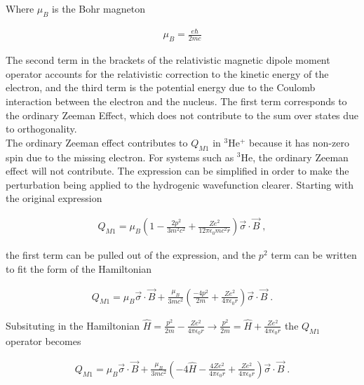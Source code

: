             \noindent Where $\mu_B$ is the Bohr magneton
            
            \begin{align}
                \mu_B = \frac{e \hbar}{2mc}
            \end{align}

            \noindent The second term in the brackets of the relativistic magnetic dipole moment operator accounts for the relativistic correction to the kinetic energy of the electron, and the third term is the potential energy due to the Coulomb interaction between the electron and the nucleus. The first term corresponds to the ordinary Zeeman Effect, which does not contribute to the sum over states due to orthogonality.\\

            The ordinary Zeeman effect contributes to $Q_{M1}$ in $^3$He$^+$ because it has non-zero spin due to the missing electron. For systems such as $^3$He, the ordinary Zeeman effect will not contribute. The expression can be simplified in order to make the perturbation being applied to the hydrogenic wavefunction clearer. Starting with the original expression 

            \begin{align}
                Q_{M1} = \mu_B\left( 1 - \frac{2p^2}{3m^2c^2} + \frac{Ze^2}{12\pi \epsilon_0 mc^2 r} \right) \vec{\sigma} \cdot \vec{B}\;,
            \end{align}

            \noindent the first term can be pulled out of the expression, and the $p^2$ term can be written to fit the form of the Hamiltonian 

            \begin{align}
                Q_{M1} = \mu_B \vec{\sigma} \cdot \vec{B} + \frac{\mu_B}{3mc^2} \left( \frac{-4p^2}{2m} + \frac{Ze^2}{4\pi \epsilon_0 r} \right) \vec{\sigma} \cdot \vec{B}\;.
            \end{align}

            \noindent Subsituting in the Hamiltonian $\hat{H} = \frac{p^2}{2m} - \frac{Ze^2}{4\pi \epsilon_0 r} \longrightarrow \frac{p^2}{2m} = \hat{H} + \frac{Ze^2}{4\pi \epsilon_0 r}$ the $Q_{M1}$ operator becomes 

            \begin{align}
                Q_{M1} = \mu_B \vec{\sigma} \cdot \vec{B} + \frac{\mu_B}{3mc^2} \left( -4\hat{H} - \frac{4Ze^2}{4\pi \epsilon_0 r} + \frac{Ze^2}{4\pi \epsilon_0 r} \right) \vec{\sigma} \cdot \vec{B}\;.
            \end{align}


